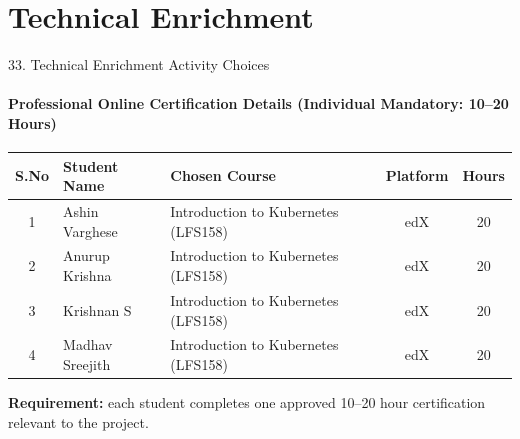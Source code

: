 \documentclass[aspectratio=169, 11pt]{beamer}
\renewcommand{\arraystretch}{1.15}
\begin{document}
\section{Technical Enrichment}
\begin{frame}{33. Technical Enrichment Activity Choices}
    \framesubtitle{Professional Online Certification Details (Individual Mandatory: 10--20 Hours)}
    \begin{table}
        \centering
        \footnotesize
        \renewcommand{\arraystretch}{1.15}
        \begin{tabular}{|c|p{2.6cm}|p{5.0cm}|c|c|}
            \hline
            \textbf{S.No} & \textbf{Student Name} & \textbf{Chosen Course} & \textbf{Platform} & \textbf{Hours} \\
            \hline
            1 & Ashin Varghese & Introduction to Kubernetes (LFS158) & edX & 20 \\
            \hline
            2 & Anurup Krishna & Introduction to Kubernetes (LFS158) & edX & 20 \\
            \hline
            3 & Krishnan S & Introduction to Kubernetes (LFS158) & edX & 20 \\
            \hline
            4 & Madhav Sreejith & Introduction to Kubernetes (LFS158) & edX & 20 \\
            \hline
        \end{tabular}
    \end{table}
    \vspace{0.1cm}
    \scriptsize \textbf{Requirement:} each student completes one approved 10--20 hour certification relevant to the project.
\end{frame}

\end{document}
